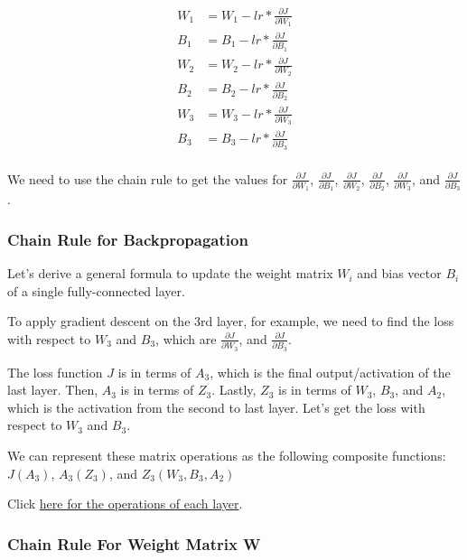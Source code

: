 \documentclass[openany]{book}
\begin{document}
\begin{align*}
W_1 &= W_1 - lr * \frac{\partial J}{\partial W_1} \\
B_1 &= B_1 - lr * \frac{\partial J}{\partial B_1} \\
W_2 &= W_2 - lr * \frac{\partial J}{\partial W_2} \\
B_2 &= B_2 - lr * \frac{\partial J}{\partial B_2} \\
W_3 &= W_3 - lr * \frac{\partial J}{\partial W_3} \\
B_3 &= B_3 - lr * \frac{\partial J}{\partial B_3} \\
\end{align*}

We need to use the chain rule to get the values for
\(\frac{\partial J}{\partial W_1}\),
\(\frac{\partial J}{\partial B_1}\),
\(\frac{\partial J}{\partial W_2}\),
\(\frac{\partial J}{\partial B_2}\),
\(\frac{\partial J}{\partial W_3}\), and
\(\frac{\partial J}{\partial B_3}\).

    \subsubsection{Chain Rule for
Backpropagation}\label{chain-rule-for-backpropagation}

Let's derive a general formula to update the weight matrix \(W_i\) and
bias vector \(B_i\) of a single fully-connected layer.

To apply gradient descent on the 3rd layer, for example, we need to find
the loss with respect to \(W_3\) and \(B_3\), which are
\(\frac{\partial J}{\partial W_3}\), and
\(\frac{\partial J}{\partial B_3}\).

The loss function \(J\) is in terms of \(A_3\), which is the final
output/activation of the last layer. Then, \(A_3\) is in terms of
\(Z_3\). Lastly, \(Z_3\) is in terms of \(W_3\), \(B_3\), and \(A_2\),
which is the activation from the second to last layer. Let's get the
loss with respect to \(W_3\) and \(B_3\).

We can represent these matrix operations as the following composite
functions: \(J(A_3)\), \(A_3(Z_3)\), and \(Z_3(W_3, B_3, A_2)\)

Click
\hyperref[our-network-s-forward-propagation]{here for the operations of each layer}.

    \subsubsection{Chain Rule For Weight Matrix
W}\label{chain-rule-for-weight-matrix-w}
\end{document}
